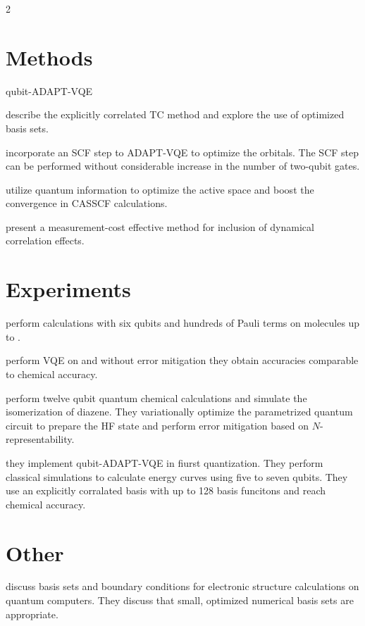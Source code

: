 \documentclass[english,a4paper,12pt]{article}
\title{}
\author{}
\date{}
\begin{document}
\begin{multicols}{2}

\section{Methods}

 qubit-ADAPT-VQE

 describe the explicitly correlated TC method and explore the use of optimized basis sets.

 incorporate an SCF step to ADAPT-VQE to optimize the orbitals.
The SCF step can be performed without considerable increase in the number of two-qubit gates.

 utilize quantum information to optimize the active space and boost the convergence in CASSCF calculations.

 present a measurement-cost effective method for inclusion of dynamical correlation effects.

\section{Experiments}

 perform calculations with six qubits and hundreds of Pauli terms on molecules up to .

 perform VQE on  and without error mitigation they obtain accuracies comparable to chemical accuracy.

 perform twelve qubit quantum chemical calculations and simulate the isomerization of diazene.
They variationally optimize the parametrized quantum circuit to prepare the HF state and perform error mitigation based on $N$-representability.

 they implement qubit-ADAPT-VQE in fiurst quantization.
They perform classical simulations to calculate  energy curves using five to seven qubits.
They use an explicitly corralated basis with up to 128 basis funcitons and reach chemical accuracy.

\section{Other}

 discuss basis sets and boundary conditions for electronic structure calculations on quantum computers.
They discuss that small, optimized numerical basis sets are appropriate.

\end{multicols}
\end{document}

